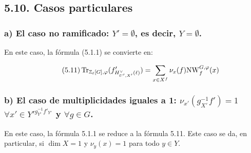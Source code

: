 \subsection*{5.10. Casos particulares}
\subsubsection*{a) El caso no ramificado: $Y' = \emptyset$, es decir, $Y = \emptyset$.}

En este caso, la fórmula (5.1.1) se convierte en:

\begin{equation}\tag{5.11}
\operatorname{Tr}_{\mathbb Z_\ell[G],\varphi}(f'_{H^\vee_{U',X'}(\ell)}) = \sum_{x \in X^f} \nu_x(f) \mathrm{NW}_f^{G,\varphi}(x)
\end{equation}

\subsubsection*{b) El caso de multiplicidades iguales a 1: $\nu_{x'}(g_{X'}^{-1}f') = 1$ $\forall x'\in {Y'}^{g_{Y'}^{-1}f'_{Y'}}$ y $\forall g\in G$.}

En este caso, la fórmula 5.1.1 se reduce a la fórmula 5.11. Este caso se da, en particular, si $\dim X = 1$ y $\nu_y(x)=1$ para todo $y\in Y$.%
